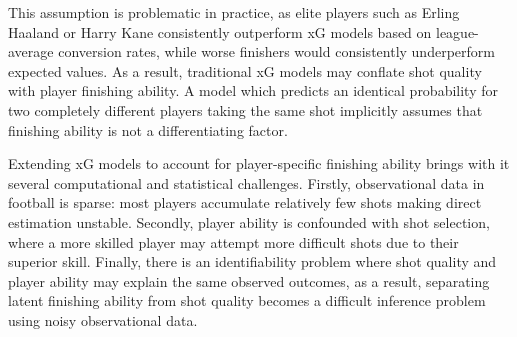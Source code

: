 \documentclass{article}
\begin{document}
This assumption is problematic in practice, as elite players such as Erling Haaland or Harry Kane consistently outperform xG models based on league-average conversion rates, while worse finishers would consistently underperform expected values. As a result, traditional xG models may conflate shot quality with player finishing ability. A model which predicts an identical probability for two completely different players taking the same shot implicitly assumes that finishing ability is not a differentiating factor.

Extending xG models to account for player-specific finishing ability brings with it several computational and statistical challenges. Firstly, observational data in football is sparse: most players accumulate relatively few shots making direct estimation unstable. Secondly, player ability is confounded with shot selection, where a more skilled player may attempt more difficult shots due to their superior skill. Finally, there is an identifiability problem where shot quality and player ability may explain the same observed outcomes, as a result, separating latent finishing ability from shot quality becomes a difficult inference problem using noisy observational data.
\end{document}
